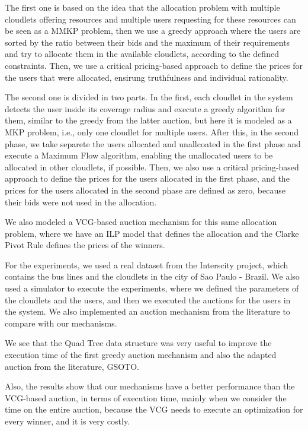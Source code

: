 \documentclass[English]{ic-tese-v3}
\begin{document}
The first one is based on the idea that the allocation problem with multiple cloudlets offering resources and multiple users requesting for these resources can be seen as a MMKP problem, then we use a greedy approach where the users are sorted by the ratio between their bids and the maximum of their requirements and try to allocate them in the available cloudlets, according to the defined constraints. Then, we use a critical pricing-based approach to define the prices for the users that were allocated, ensirung truthfulness and individual rationality.

The second one is divided in two parts. In the first, each cloudlet in the system detects the user inside its coverage radius and execute a greedy algorithm for them, similar to the greedy from the latter auction, but here it is modeled as a MKP problem, i.e., only one cloudlet for multiple users. After this, in the second phase, we take separete the users allocated and unallcoated in the first phase and execute a Maximum Flow algorithm, enabling the unallocated users to be allocated in other cloudlets, if possible. Then, we also use a critical pricing-based approach to define the prices for the users allocated in the first phase, and the prices for the users allocated in the second phase are defined as zero, because their bids were not used in the allocation.

We also modeled a VCG-based auction mechanism for this same allocation problem, where we have an ILP model that defines the allocation and the Clarke Pivot Rule defines the prices of the winners.

For the experiments, we used a real dataset from the Interscity project, which contains the bus lines and the cloudlets in the city of Sao Paulo - Brazil. We also used a simulator to execute the experiments, where we defined the parameters of the cloudlets and the users, and then we executed the auctions for the users in the system. We also implemented an auction mechanism from the literature to compare with our mechanisms.

We see that the Quad Tree data structure was very useful to improve the execution time of the first greedy auction mechanism and also the adapted auction from the literature, GSOTO.

Also, the results show that our mechanisms have a better performance than the VCG-based auction, in terms of execution time, mainly when we consider the time on the entire auction, because the VCG needs to execute an optimization for every winner, and it is very costly.
\end{document}
